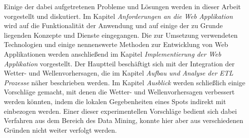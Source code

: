 Einige der dabei aufgetretenen Probleme und Lösungen werden in dieser
Arbeit vorgestellt und diskutiert. Im Kapitel \textit{Anforderungen an
  die Web Applikation} wird auf die Funktionalität der Anwendung und
auf einige der zu Grunde liegenden Konzepte und Dienste
eingegangen. Die zur Umsetzung verwendeten Technologien und einige
nennenswerte Methoden zur Entwicklung von Web Applikationen werden
anschließend im Kapitel \textit{Implementierung der Web Applikation}
vorgestellt. Der Hauptteil beschäftigt sich mit der Integration der
Wetter- und Wellenvorhersagen, die im Kapitel \textit{Aufbau und
  Analyse der ETL Prozesse} näher beschrieben werden. Im Kapitel
\textit{Ausblick} werden schließlich einige Vorschläge gemacht, mit
denen die Wetter- und Wellenvorhersagen verbessert werden könnten,
indem die lokalen Gegebenheiten eines Spots indirekt mit einbezogen
werden. Einer dieser experimentellen Vorschläge bedient sich dabei
Verfahren aus dem Bereich des Data Mining, konnte hier aber aus
verschiedenen Gründen nicht weiter verfolgt werden.

